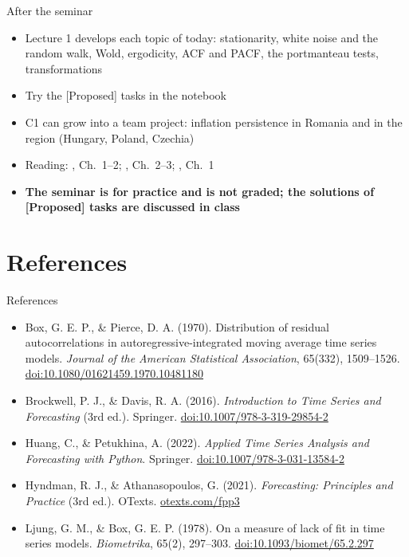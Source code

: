 \begin{frame}{After the seminar}
\itemsize{\small}
\begin{itemize}
    \item Lecture 1 develops each topic of today: stationarity, white noise and the random walk, Wold, ergodicity, ACF and PACF, the portmanteau tests, transformations
    \item Try the [Proposed] tasks in the notebook
    \item C1 can grow into a team project: inflation persistence in Romania and in the region (Hungary, Poland, Czechia)
    \item Reading: , Ch.~1--2; , Ch.~2--3; , Ch.~1
    \item \textbf{The seminar is for practice and is not graded; the solutions of [Proposed] tasks are discussed in class}
\end{itemize}
\end{frame}


\section{References}

\begin{frame}{References}
\itemsize{\tiny}
\begin{itemize}
    \item Box, G. E. P., \& Pierce, D. A. (1970). Distribution of residual autocorrelations in autoregressive-integrated moving average time series models. \textit{Journal of the American Statistical Association}, 65(332), 1509--1526. \href{https://doi.org/10.1080/01621459.1970.10481180}{doi:10.1080/01621459.1970.10481180}
    \item Brockwell, P. J., \& Davis, R. A. (2016). \textit{Introduction to Time Series and Forecasting} (3rd ed.). Springer. \href{https://doi.org/10.1007/978-3-319-29854-2}{doi:10.1007/978-3-319-29854-2}
    \item Huang, C., \& Petukhina, A. (2022). \textit{Applied Time Series Analysis and Forecasting with Python}. Springer. \href{https://doi.org/10.1007/978-3-031-13584-2}{doi:10.1007/978-3-031-13584-2}
    \item Hyndman, R. J., \& Athanasopoulos, G. (2021). \textit{Forecasting: Principles and Practice} (3rd ed.). OTexts. \href{https://otexts.com/fpp3/}{otexts.com/fpp3}
    \item Ljung, G. M., \& Box, G. E. P. (1978). On a measure of lack of fit in time series models. \textit{Biometrika}, 65(2), 297--303. \href{https://doi.org/10.1093/biomet/65.2.297}{doi:10.1093/biomet/65.2.297}
\end{itemize}
\end{frame}


